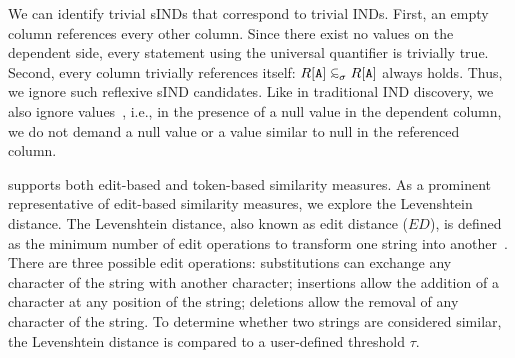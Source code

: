 We can identify trivial sINDs that correspond to trivial INDs.
First, an empty column references every other column.
Since there exist no values on the dependent side, every statement using the universal quantifier is trivially true.
Second, every column trivially references itself: $R[\mathtt{A}] \simIND{\sigma} R[\mathtt{A}]$ always holds.
Thus, we ignore such reflexive sIND candidates. 
Like in traditional IND discovery, we also ignore  values~\cite{papenbrock2015divide}, i.e., in the presence of a null value in the dependent column, we do not demand a null value or a value similar to null in the referenced column.

\sawfish supports both edit-based and token-based similarity measures.
As a prominent representative of edit-based similarity measures, we explore the Levenshtein distance.
The Levenshtein distance, also known as edit distance ($ED$), is defined as the minimum number of edit operations to transform one string into another~\cite{levenshtein1966binary}.
There are three possible edit operations: substitutions can exchange any character of the string with another character; insertions allow the addition of a character at any position of the string; deletions allow the removal of any character of the string.
To determine whether two strings are considered similar, the Levenshtein distance is compared to a user-defined threshold $\tau$.

